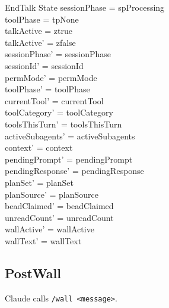 \documentclass[a4paper,10pt,fleqn]{article}
\begin{document}
\begin{schema}{EndTalk}
  \Delta State
  \where
  sessionPhase = spProcessing \\
  toolPhase = tpNone \\
  talkActive = ztrue \\
  talkActive' = zfalse \\
  sessionPhase' = sessionPhase \\
  sessionId' = sessionId \\
  permMode' = permMode \\
  toolPhase' = toolPhase \\
  currentTool' = currentTool \\
  toolCategory' = toolCategory \\
  toolsThisTurn' = toolsThisTurn \\
  activeSubagents' = activeSubagents \\
  context' = context \\
  pendingPrompt' = pendingPrompt \\
  pendingResponse' = pendingResponse \\
  planSet' = planSet \\
  planSource' = planSource \\
  beadClaimed' = beadClaimed \\
  unreadCount' = unreadCount \\
  wallActive' = wallActive \\
  wallText' = wallText
\end{schema}

\subsection{PostWall}

Claude calls \texttt{/wall <message>}.
\end{document}
